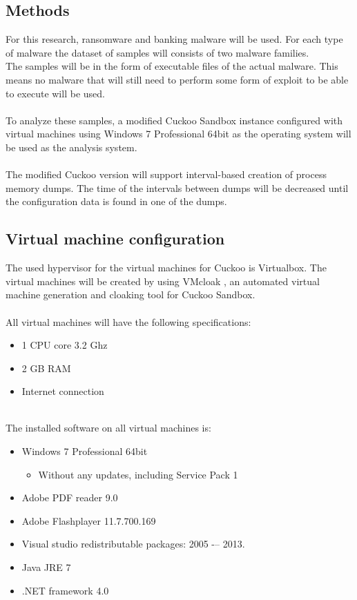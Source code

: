 \documentclass[conference]{IEEEtran}
\begin{document}
\subsection{Methods}

For this research, ransomware and banking malware will be used. For each type of malware the dataset of samples will consists of two malware families.\\
The samples will be in the form of executable files of the actual malware. This means no malware that will still need to perform some form of exploit to be able to execute will be used.\\\\To analyze these samples, a modified Cuckoo Sandbox instance configured with virtual machines using Windows 7  Professional 64bit as the operating system will be used as the analysis system. \\\\The modified Cuckoo version will support interval-based creation of process memory dumps. The time of the intervals between dumps will be decreased until the configuration data is found in one of the dumps.


\subsection{Virtual machine configuration}

The used hypervisor for the virtual machines for Cuckoo is Virtualbox. The virtual machines will be created by using VMcloak \cite{vmcloak}, an automated virtual machine generation and cloaking tool for Cuckoo Sandbox.\\\\
All virtual machines will have the following specifications:
\begin{itemize}
\item 1 CPU core 3.2 Ghz
\item 2 GB RAM
\item Internet connection
\end{itemize}
\ \\
The installed software on all virtual machines is:
\begin{itemize}
\item Windows 7 Professional 64bit
\begin{itemize}
\item Without any updates, including Service Pack 1
\end{itemize}
\item Adobe PDF reader 9.0
\item Adobe Flashplayer 11.7.700.169
\item Visual studio redistributable packages: 2005 -– 2013.
\item Java JRE 7
\item .NET framework 4.0
\end{itemize}
\end{document}
